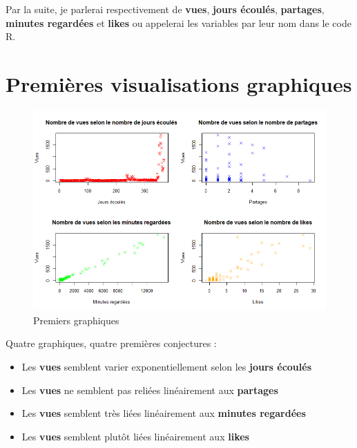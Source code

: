 Par la suite, je parlerai respectivement de \textbf{vues}, \textbf{jours
écoulés}, \textbf{partages}, \textbf{minutes regardées} et
\textbf{likes} ou appelerai les variables par leur nom dans le code R.

\hypertarget{premiuxe8res-visualisations-graphiques}{%
\section{Premières visualisations
graphiques}\label{premiuxe8res-visualisations-graphiques}}

\begin{Schunk}
\begin{figure}[htbp]

{\centering \includegraphics[width=6in]{premiersGraphiques} 

}

\caption[Premiers graphiques]{Premiers graphiques}\label{fig:firstGraphs}
\end{figure}
\end{Schunk}

Quatre graphiques, quatre premières conjectures :

\begin{itemize}
\tightlist
\item
  Les \textbf{vues} semblent varier exponentiellement selon les
  \textbf{jours écoulés}
\item
  Les \textbf{vues} ne semblent pas reliées linéairement aux
  \textbf{partages}
\item
  Les \textbf{vues} semblent très liées linéairement aux \textbf{minutes
  regardées}
\item
  Les \textbf{vues} semblent plutôt liées linéairement aux
  \textbf{likes}
\end{itemize}

